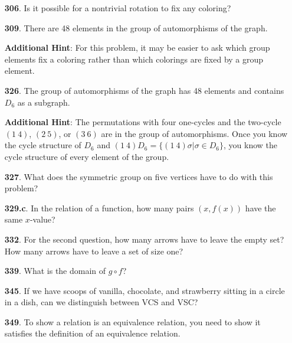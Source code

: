 \documentclass[10pt,]{book}
\theoremstyle{plain}
\theoremstyle{definition}
\theoremstyle{definition}
\numberwithin{equation}{chapter}
\begin{document}
\begin{itemize}[itemsep=1em]
\item[\textbf{306}.]\hypertarget{p-1713}{}%
Is it possible for a nontrivial rotation to fix any coloring?%

\item[\textbf{309}.]\hypertarget{p-1723}{}%
There are 48 elements in the group of automorphisms of the graph.%

\par\smallskip
\noindent\textbf{Additional Hint}: \hypertarget{p-1724}{}%
For this problem, it may be easier to ask which group elements fix a coloring rather than which colorings are fixed by a group element.%

\item[\textbf{326}.]\hypertarget{p-1800}{}%
The group of automorphisms of the graph has 48 elements and contains \(D_6\) as a subgraph.%

\par\smallskip
\noindent\textbf{Additional Hint}: \hypertarget{p-1801}{}%
The permutations with four one-cycles and the two-cycle \((1\ 4)\), \((2\ 5)\), or \((3\ 6)\) are in the group of automorphisms. Once you know the cycle structure of \(D_6\) and \((1\ 4)D_6 = \{(1\ 4)\sigma | \sigma \in D_6\}\), you know the cycle structure of every element of the group.%

\item[\textbf{327}.]\hypertarget{p-1808}{}%
What does the symmetric group on five vertices have to do with this problem?%

\item[\textbf{329.c}.]\hypertarget{p-1853}{}%
In the relation of a function, how many pairs \((x, f (x))\) have the same \(x\)-value?%

\item[\textbf{332}.]\hypertarget{p-1874}{}%
For the second question, how many arrows have to leave the empty set? How many arrows have to leave a set of size one?%

\item[\textbf{339}.]\hypertarget{p-1912}{}%
What is the domain of \(g \circ f\)?%

\item[\textbf{345}.]\hypertarget{p-1927}{}%
If we have scoops of vanilla, chocolate, and strawberry sitting in a circle in a dish, can we distinguish between VCS and VSC?%

\item[\textbf{349}.]\hypertarget{p-1943}{}%
To show a relation is an equivalence relation, you need to show it satisfies the definition of an equivalence relation.%


\end{itemize}
\end{document}
